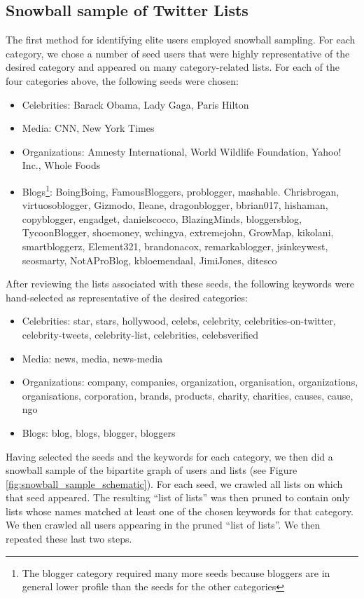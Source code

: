 \documentclass[phd,tocprelim]{cornell}
\begin{document}
\subsection{Snowball sample of Twitter Lists}
The first method for identifying elite users employed snowball sampling.
For each category, we chose a number of seed users that were highly
representative of the desired category and appeared on many
category-related lists. For each of the four categories above, the
following seeds were chosen:
\begin{itemize}
	\item Celebrities: Barack Obama, Lady Gaga, Paris Hilton
	\item Media: CNN, New York Times
	\item Organizations: Amnesty International, World Wildlife
          Foundation, Yahoo! Inc., Whole Foods
	\item Blogs\footnote{The blogger category required many more seeds
          because bloggers are in general lower profile than the seeds for
          the other categories}: BoingBoing, FamousBloggers, problogger,
          mashable. Chrisbrogan, virtuosoblogger, Gizmodo, Ileane,
          dragonblogger, bbrian017, hishaman, copyblogger, engadget,
          danielscocco, BlazingMinds, bloggersblog, TycoonBlogger,
          shoemoney, wchingya, extremejohn, GrowMap, kikolani,
          smartbloggerz, Element321, brandonacox, remarkablogger,
          jsinkeywest, seosmarty, NotAProBlog, kbloemendaal, JimiJones,
          ditesco
\end{itemize}

After reviewing the lists associated with these seeds, the following
keywords were hand-selected as representative of the desired categories:
\begin{itemize}
	\item Celebrities: star, stars, hollywood, celebs, celebrity,
          celebrities-on-twitter, celebrity-tweets, celebrity-list,
          celebrities, celebsverified
	\item Media: news, media, news-media %
	\item Organizations: company, companies, organization,
          organisation, organizations, organisations, corporation,
          brands, products, charity, charities, causes, cause, ngo
	\item Blogs: blog, blogs, blogger, bloggers
\end{itemize}

Having selected the seeds and the keywords for each category, we then did a
snowball sample of the bipartite graph of users and lists (see Figure
\ref{fig:snowball_sample_schematic}).  For each seed, we crawled all lists on
which that seed appeared. The resulting ``list of lists'' was then pruned
to contain only lists whose names matched at least one of the chosen
keywords for that category.  We then crawled all users appearing in the
pruned ``list of lists''.  We then repeated these last two steps.
\end{document}
